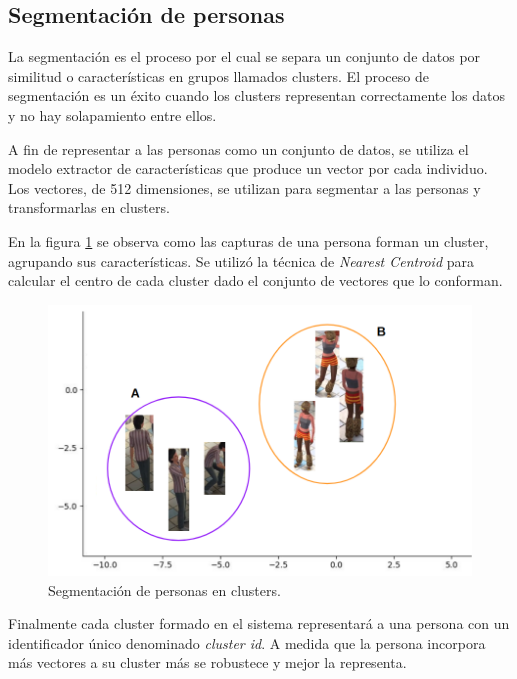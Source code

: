 \subsection{Segmentación de personas}
\label{sec:segmentacionPersonas}

La segmentación es el proceso por el cual se separa un conjunto de datos por similitud o características en grupos llamados clusters. El proceso de segmentación es un éxito cuando los clusters representan correctamente los datos y no hay solapamiento entre ellos.

A fin de representar a las personas como un conjunto de datos, se utiliza el modelo extractor de características que produce un vector por cada individuo. Los vectores, de 512 dimensiones, se utilizan para segmentar a las personas y transformarlas en clusters.

En la figura \ref{fig:clusterPersonas} se observa como las capturas de una persona forman un cluster, agrupando sus características. Se utilizó la técnica de \textit{Nearest Centroid} \citep{NEAREST_CENTROID} para calcular el centro de cada cluster dado el conjunto de vectores que lo conforman.

\begin{figure}[ht]
	\centering
	\includegraphics[scale=.6]{./Figures/clusterPersonas.png}
	\caption{Segmentación de personas en clusters.}
	\label{fig:clusterPersonas}
\end{figure}

Finalmente cada cluster formado en el sistema representará a una persona con un identificador único denominado \textit{cluster id}. A medida que la persona incorpora más vectores a su cluster más se robustece y mejor la representa.

\newpage

